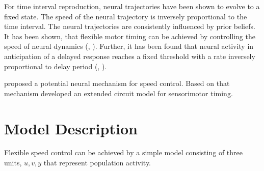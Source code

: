 \documentclass[10pt]{article}
\begin{document}
For time interval reproduction, neural trajectories have been shown to evolve to a fixed state. The speed of the neural trajectory is inversely proportional to the time interval.
The neural trajectories are consistently influenced by prior beliefs.
It has been shown, that flexible motor timing can be achieved by controlling the speed of neural dynamics (\cite{Sohn2019}, \cite{Wang2018}). 
Further, it has been found that neural activity in anticipation of a delayed response reaches a fixed threshold with a rate inversely proportional to delay period (\cite{Murakami2014}, \cite{Mita2009}).

\cite{Wang2018} proposed a potential neural mechanism for speed control. Based on that mechanism \cite{Egger2020} developed an extended circuit model for sensorimotor timing.


\section{Model Description}
Flexible speed control can be achieved by a simple model consisting of three units, $u, v, y$ that represent population activity. 
\end{document}
